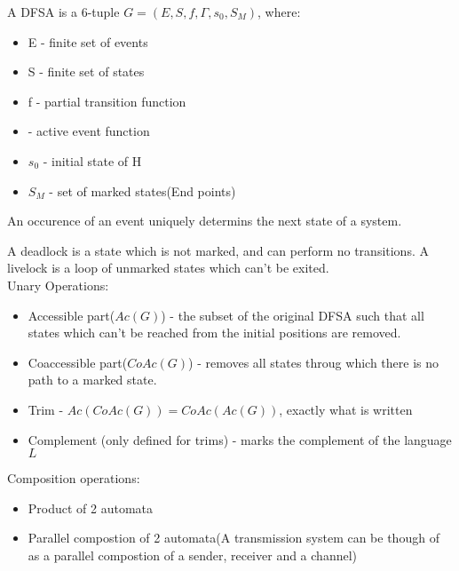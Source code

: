 {

    A DFSA is a 6-tuple $G=(E,S,f,\Gamma,s_0,S_M)$, where:
    \begin{itemize}
            \item E - finite set of events
            \item S - finite set of states
            \item f - partial transition function
            \item \Gamma - active event function
            \item $s_0$ - initial state of H
            \item $S_M$ - set of marked states(End points)
    \end{itemize}
 An occurence of an event uniquely determins the next state of a system.

 A deadlock  is a state which is not marked, and can perform no transitions. A livelock is a loop of unmarked states which can't be exited.
 \\
Unary Operations:
 \begin{itemize}
         \item Accessible part($Ac(G)$) - the subset of the original DFSA such that all states which can't be reached from the initial positions are removed.
         \item Coaccessible part($CoAc(G)$) - removes all states throug which there is no path to a marked state.
         \item Trim - $Ac(CoAc(G)) = CoAc(Ac(G))$, exactly what is written
         \item Complement (only defined for trims) - marks the complement of the language  $L$
 \end{itemize}

Composition operations:
\begin{itemize}
        \item Product of 2 automata
        \item Parallel compostion of 2 automata(A transmission system can be though of as a parallel compostion of a sender, receiver and a channel)
\end{itemize}
}

{

}

{

}

